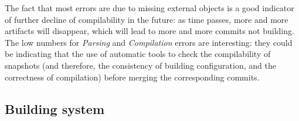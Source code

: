 

The fact that most errors are due to missing external objects is a good indicator of further decline of compilability in the future: as time passes, more and more artifacts will disappear, which will lead to more and more commits not building. The low numbers for \textit{Parsing} and \textit{Compilation} errors are interesting: they could be indicating that the use of automatic tools to check the compilability of snapshots (and therefore, the consistency of building configuration, and the correctness of compilation) before merging the corresponding commits.

\vspace{0.2cm}


\subsection{Building system}


